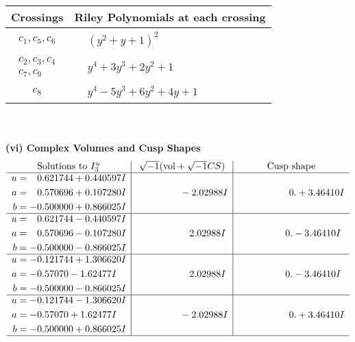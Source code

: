 \documentclass[1p]{elsarticle_modified}
\theoremstyle{definition}
\newcommand{\I}{\sqrt{-1}}
\begin{document}
\begin{tabular}{m{50pt}|m{274pt}}
Crossings & \hspace{64pt}Riley Polynomials at each crossing \\
\hline $$\begin{aligned}c_{1},c_{5},c_{6}\end{aligned}$$&$\begin{aligned}
&(y^2+y+1)^2
\end{aligned}$\\
\hline $$\begin{aligned}c_{2},c_{3},c_{4}\\c_{7},c_{9}\end{aligned}$$&$\begin{aligned}
&y^4+3 y^3+2 y^2+1
\end{aligned}$\\
\hline $$\begin{aligned}c_{8}\end{aligned}$$&$\begin{aligned}
&y^4-5 y^3+6 y^2+4 y+1
\end{aligned}$\\
\hline
\end{tabular}\\~\\
\newpage\flushleft \textbf{(vi) Complex Volumes and Cusp Shapes}
$$\begin{array}{c|c|c}  
\text{Solutions to }I^u_{3}& \I (\text{vol} + \sqrt{-1}CS) & \text{Cusp shape}\\
 \hline 
\begin{aligned}
u &= \phantom{-}0.621744 + 0.440597 I \\
a &= \phantom{-}0.570696 + 0.107280 I \\
b &= -0.500000 + 0.866025 I\end{aligned}
 & \phantom{-0.000000 } -2.02988 I & \phantom{-0.000000 -}0. + 3.46410 I \\ \hline\begin{aligned}
u &= \phantom{-}0.621744 - 0.440597 I \\
a &= \phantom{-}0.570696 - 0.107280 I \\
b &= -0.500000 - 0.866025 I\end{aligned}
 & \phantom{-0.000000 -}2.02988 I & \phantom{-0.000000 } 0. - 3.46410 I \\ \hline\begin{aligned}
u &= -0.121744 + 1.306620 I \\
a &= -0.57070 - 1.62477 I \\
b &= -0.500000 - 0.866025 I\end{aligned}
 & \phantom{-0.000000 -}2.02988 I & \phantom{-0.000000 } 0. - 3.46410 I \\ \hline\begin{aligned}
u &= -0.121744 - 1.306620 I \\
a &= -0.57070 + 1.62477 I \\
b &= -0.500000 + 0.866025 I\end{aligned}
 & \phantom{-0.000000 } -2.02988 I & \phantom{-0.000000 -}0. + 3.46410 I\\
 \hline 
 \end{array}$$\newpage\newpage\renewcommand{\arraystretch}{1}
\end{document}
